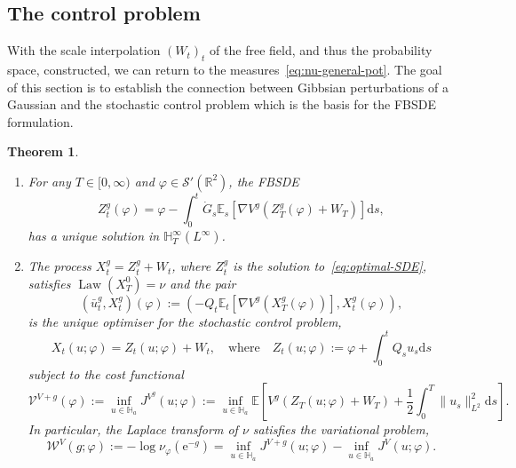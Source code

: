 \documentclass[11pt, a4paper]{scrartcl}
\numberwithin{equation}{section}
\theoremstyle{plain}
\newtheorem{theorem}[foo]{Theorem}
\theoremstyle{remark}
\newcommand{\assign}{:=}
\newcommand{\mathd}{\mathrm{d}}
\newcommand{\mathe}{\mathrm{e}}
\newcommand{\tmdummy}{$\mbox{}$}
\newcommand{\tmop}[1]{\ensuremath{\operatorname{#1}}}
\newenvironment{enumeratealpha}{\begin{enumerate}[a{\textup{)}}] }{\end{enumerate}}
\begin{document}
\subsection{The control problem}

With the scale interpolation $(W_t)_t$ of the free field, and thus the
probability space, constructed, we can return to the
measures~\eqref{eq:nu-general-pot}. The goal of this section is to establish
the connection between Gibbsian perturbations of a Gaussian and the stochastic
control problem which is the basis for the FBSDE formulation.
\begin{theorem}
	\label{thm:ctrl-FBSDE}{\tmdummy}
	\begin{enumeratealpha}
		\item  \label{prop:optimal-SDE}For any $T \in [0, \infty)$ and $\varphi
			\in \mathcal{S}' (\mathbb{R}^2)$, the FBSDE
		\begin{equation}
			Z^g_t (\varphi) = \varphi - \int_0^t \dot{G}_s \mathbb{E}_s [\nabla V^g
			(Z^g_T (\varphi) + W_T)] \mathd s, \label{eq:optimal-SDE}
		\end{equation}
		has a unique solution in $\mathbb{H}^{\infty}_T (L^{\infty})$.

		\item \label{thm:ctrl-form}The process $X^g_t = Z_t^g + W_t$, where
		$Z_t^g$ is the solution to~\eqref{eq:optimal-SDE}, satisfies $\tmop{Law}
			(X_T^0) = \nu$ and the pair
		\begin{equation}
			(\bar{u}^g_t, X_t^g) (\varphi) \assign (- Q_t \mathbb{E}_t [\nabla V^g
			(X_T^g (\varphi))], X_t^g (\varphi)), \label{eq:optimal-pair}
		\end{equation}
		is the unique optimiser for the stochastic control problem,
		\begin{equation}
			X_t (u ; \varphi) = Z_t (u ; \varphi) + W_t, \quad \text{where} \quad
			Z_t (u ; \varphi) \assign \varphi + \int_0^t Q_s u_s \mathd s
			\label{eq:ctrl-process}
		\end{equation}
		subject to the cost functional
		\begin{equation}
			\mathcal{V}^{V + g} (\varphi) \assign \inf_{u \in \mathbb{H}_a} J^{V^g}
			(u ; \varphi) \assign \inf_{u \in \mathbb{H}_a} \mathbb{E} \left[ V^g
				(Z_T (u ; \varphi) + W_T) + \frac{1}{2} \int_0^T \| u_s \|^2_{L^2}
				\mathd s \right] . \label{eq:def-value-func}
		\end{equation}
		In particular, the Laplace transform of $\nu$ satisfies the variational
		problem,
		\begin{equation}
			\mathcal{W}^V (g ; \varphi) \assign - \log \nu_{\varphi} (\mathe^{- g})
			= \inf_{u \in \mathbb{H}_a} J^{V + g} (u ; \varphi) - \inf_{u \in
				\mathbb{H}_a} J^V (u ; \varphi) . \label{eq:def-Wf}
		\end{equation}
	\end{enumeratealpha}
\end{theorem}
\end{document}
